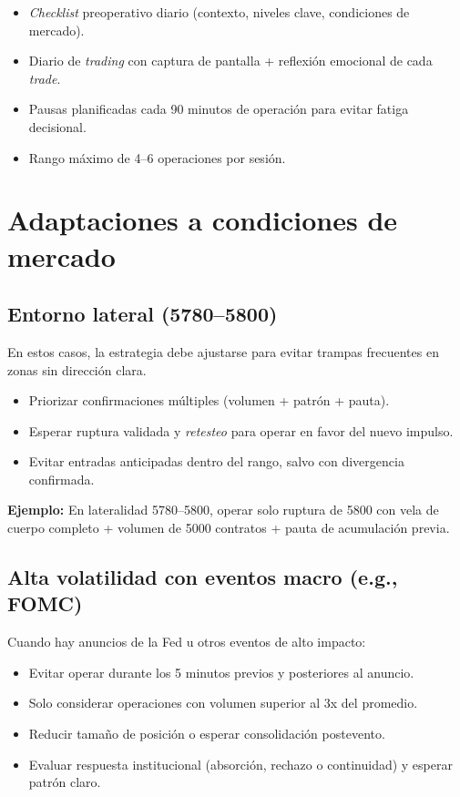 \begin{itemize}
    \item \textit{Checklist} preoperativo diario (contexto, niveles clave, condiciones de mercado).
    \item Diario de \textit{trading} con captura de pantalla + reflexi\'on emocional de cada \textit{trade}.
    \item Pausas planificadas cada 90 minutos de operaci\'on para evitar fatiga decisional.
    \item Rango m\'aximo de 4--6 operaciones por sesi\'on.
\end{itemize}

\vspace{2em}

\section{Adaptaciones a condiciones de mercado}

\subsection*{Entorno lateral (5780--5800)}

En estos casos, la estrategia debe ajustarse para evitar trampas frecuentes en zonas sin direcci\'on clara.

\begin{itemize}
    \item Priorizar confirmaciones m\'ultiples (volumen + patr\'on + pauta).
    \item Esperar ruptura validada y \textit{retesteo} para operar en favor del nuevo impulso.
    \item Evitar entradas anticipadas dentro del rango, salvo con divergencia confirmada.
\end{itemize}

\textbf{Ejemplo:} En lateralidad 5780--5800, operar solo ruptura de 5800 con vela de cuerpo completo + volumen de 5000 contratos + pauta de acumulaci\'on previa.

\subsection*{Alta volatilidad con eventos macro (e.g., FOMC)}

Cuando hay anuncios de la Fed u otros eventos de alto impacto:

\begin{itemize}
    \item Evitar operar durante los 5 minutos previos y posteriores al anuncio.
    \item Solo considerar operaciones con volumen superior al 3x del promedio.
    \item Reducir tama\~no de posici\'on o esperar consolidaci\'on postevento.
    \item Evaluar respuesta institucional (absorci\'on, rechazo o continuidad) y esperar patr\'on claro.
\end{itemize}

